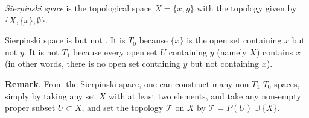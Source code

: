 \documentclass[12pt]{article}
\begin{document}
\emph{Sierpinski space} is the topological space $X=\lbrace x,y\rbrace$ with the topology given by $\lbrace X, \{ x\} ,\emptyset \rbrace$.

Sierpinski space is  but not .  It is $T_0$ because $\lbrace x\rbrace$ is the open set containing $x$ but not $y$.  It is not $T_1$ because every open set $U$ containing $y$ (namely $X$) contains $x$ (in other words, there is no open set containing $y$ but not containing $x$).

\textbf{Remark}.  From the Sierpinski space, one can construct many non-$T_1$ $T_0$ spaces, simply by taking any set $X$ with at least two elements, and take any non-empty proper subset $U\subset X$, and set the topology $\mathcal{T}$ on $X$ by $\mathcal{T}=P(U)\cup \lbrace X\rbrace$.
\end{document}

